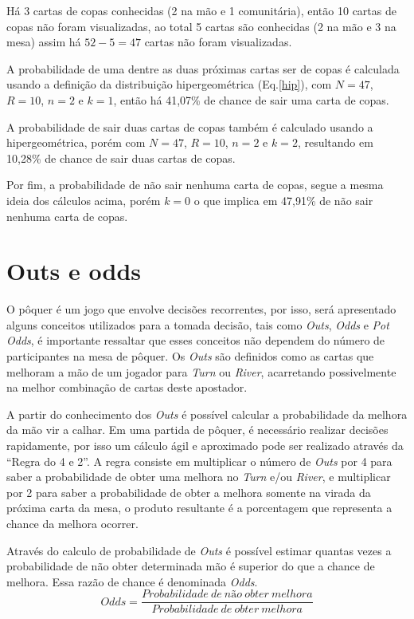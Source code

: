 \documentclass[
	12pt,				%
	oneside,			%
	a4paper,			%
	chapter=TITLE,		%
	section=TITLE,		%
	subsection=Title,	%
	subsubsection=Title,%
	brazil,				%
	]{abntex2}
\begin{document}
Há 3 cartas de copas conhecidas (2 na mão e 1 comunitária), então 10 cartas de copas não foram visualizadas, ao total 5 cartas são conhecidas (2 na mão e 3 na mesa) assim há $52 - 5 = 47$ cartas não foram visualizadas. 

A probabilidade de uma dentre as duas próximas cartas ser de copas é calculada usando a definição da distribuição hipergeométrica (Eq.\ref{hip}), com $N = 47$, $R = 10$, $n = 2$ e $k = 1$, então há 41,07\% de chance de sair uma carta de copas.

A probabilidade de sair duas cartas de copas também é calculado usando a hipergeométrica, porém com 
$N = 47$, $R = 10$, $n = 2$ e $k = 2$, resultando em 10,28\% de chance de sair duas cartas de copas.

Por fim, a probabilidade de não sair nenhuma carta de copas, segue a mesma ideia dos cálculos acima, porém $k = 0$ o que implica em 47,91\% de não sair nenhuma carta de copas.

\newpage
\section{Outs e odds}
O pôquer é um jogo que envolve decisões recorrentes, por isso, será apresentado alguns conceitos utilizados para a tomada decisão, tais como \textit{Outs}, \textit{Odds} e \textit{Pot Odds}, é importante ressaltar que esses conceitos não dependem do número de participantes na mesa de pôquer. Os \textit{Outs} são definidos como as cartas que melhoram a mão de um jogador para \textit{Turn} ou \textit{River}, acarretando possivelmente na melhor combinação de cartas deste apostador.

A partir do conhecimento  dos \textit{Outs} é possível calcular a probabilidade da melhora da mão vir a calhar. Em uma partida de pôquer, é necessário realizar decisões rapidamente, por isso um cálculo ágil e aproximado pode ser realizado através da ``Regra do 4 e 2''. A regra consiste em multiplicar o número de \textit{Outs} por 4 para saber a probabilidade de obter uma melhora no \textit{Turn} e/ou \textit{River}, e multiplicar por 2 para saber a probabilidade de obter a melhora somente na virada da próxima carta da mesa, o produto resultante é a porcentagem que representa a chance da melhora ocorrer.

Através do calculo de probabilidade de \textit{Outs} é possível estimar quantas vezes a probabilidade de não obter determinada mão é superior do que a chance de melhora. Essa razão de chance é denominada \textit{Odds}.
\begin{equation} \label{odds1}
Odds = \frac{Probabilidade\ de\ não\ obter\ melhora}{Probabilidade\ de\ obter\ melhora}
\end{equation}
\end{document}
